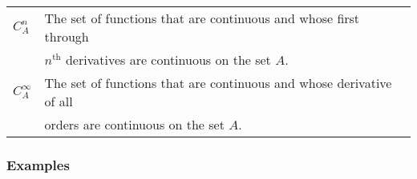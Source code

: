 \documentclass[12pt]{article}
\begin{document}
\begin{tabular}{|l | l |}
$ C_A^n$  &  The set of functions that are continuous and whose first   through  \\
                   & $n^{\mbox{th}}$  derivatives are continuous on the set $A$. \\  \hline        
                   

$ C_A^\infty$  &  The set of functions that are continuous and whose derivative of all  \\
                   & orders are continuous on the set $A$. \\  \hline                                
                   
\end{tabular}

\subsubsection*{Examples}
\end{document}
